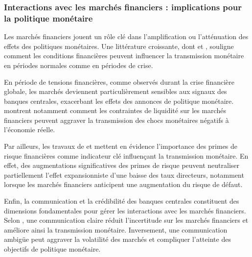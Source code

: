 \subsubsection{Interactions avec les marchés financiers : implications pour la politique monétaire}

Les marchés financiers jouent un rôle clé dans l'amplification ou l'atténuation des effets des politiques monétaires. Une littérature croissante, dont \citep{brunnermeier2014} et \citep{adrian2014}, souligne comment les conditions financières peuvent influencer la transmission monétaire en périodes normales comme en périodes de crise.

En période de tensions financières, comme observés durant la crise financière globale, les marchés deviennent particulièrement sensibles aux signaux des banques centrales, exacerbant les effets des annonces de politique monétaire. \citep{brunnermeier2009} montrent notamment comment les contraintes de liquidité sur les marchés financiers peuvent aggraver la transmission des chocs monétaires négatifs à l'économie réelle.

Par ailleurs, les travaux de \citep{gilchrist2012} et \citep{caldara2019} mettent en évidence l'importance des primes de risque financières comme indicateur clé influençant la transmission monétaire. En effet, des augmentations significatives des primes de risque peuvent neutraliser partiellement l'effet expansionniste d'une baisse des taux directeurs, notamment lorsque les marchés financiers anticipent une augmentation du risque de défaut.

Enfin, la communication et la crédibilité des banques centrales constituent des dimensions fondamentales pour gérer les interactions avec les marchés financiers. Selon \citep{hansen2016}, une communication claire réduit l'incertitude sur les marchés financiers et améliore ainsi la transmission monétaire. Inversement, une communication ambigüe peut aggraver la volatilité des marchés et compliquer l'atteinte des objectifs de politique monétaire.\\

